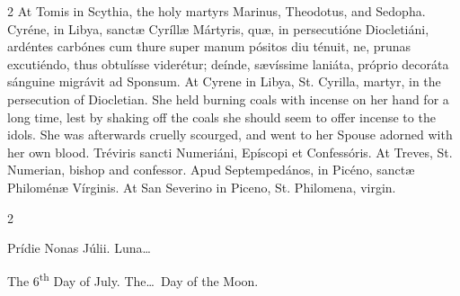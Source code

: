 \begin{paracol}{2}
\switchcolumn
{}
At Tomis in Scythia, the holy 
 martyrs Marinus, Theodotus, and Sedopha.
\switchcolumn*
{}
Cyréne, in Libya, 
 sanctæ Cyríllæ Mártyris, quæ, in persecutióne Diocletiáni, ardéntes carbónes 
 cum thure super manum pósitos diu ténuit, ne, prunas excutiéndo, thus 
 obtulísse viderétur; deínde, sævíssime laniáta, próprio decoráta sánguine 
 migrávit ad Sponsum.
\switchcolumn
{}
At Cyrene in Libya, St. Cyrilla, 
 martyr, in the persecution of Diocletian. She held burning coals with 
 incense on her hand for a long time, lest by shaking off the coals she 
 should seem to offer incense to the idols. She was afterwards cruelly 
 scourged, and went to her Spouse adorned with her own blood.
\switchcolumn*
{}
Tréviris sancti 
 Numeriáni, Epíscopi et Confessóris.
\switchcolumn
{}
At Treves, St. Numerian, bishop and 
 confessor.
\switchcolumn*
{}
Apud Septempedános, in 
 Picéno, sanctæ Philoménæ Vírginis.
\switchcolumn
{}
At San Severino in Piceno, St. 
 Philomena, virgin.
\switchcolumn*
{}
\end{paracol}


\begin{paracol}{2}
\begin{center}{\color{gregoriocolor} Prídie Nonas Júlii. 
 Luna\dots\ }\end{center}
\switchcolumn
{}
\begin{center}{\color{gregoriocolor} The 
 6\textsuperscript{th} Day of 
 July. The\dots\ Day of the Moon.}\end{center}
\end{paracol}

